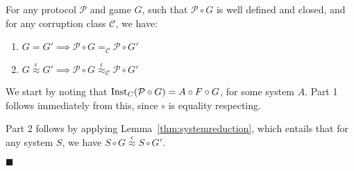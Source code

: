 \begin{theorem}
  \label{thm:vertical_composition_theorem}
  For any protocol $\mathcal{P}$ and game $G$, such that $\mathcal{P} \circ G$
  is well defined and closed, and for any corruption class $\mathcal{C}$, we have:
  \begin{enumerate}
    \item $G = G' \implies \mathcal{P} \circ G =_{\mathcal{C}} \mathcal{P} \circ G'$
    \item $G \overset{\epsilon}{\approx} G' \implies \mathcal{P} \circ G \overset{\epsilon}{\approx}_{\mathcal{C}} \mathcal{P} \circ G'$
  \end{enumerate}
  
 We start by noting that $\text{Inst}_C(\mathcal{P} \circ G) = A \circ F \circ G$,
for some system $A$.
Part 1 follows immediately from this, since $\circ$ is equality respecting.

Part 2 follows by applying Lemma~\ref{thm:systemreduction},
which entails that for any system $S$, we have $S \circ G \overset{\epsilon}{\approx} S \circ G'$.

$\blacksquare$
\end{theorem}

